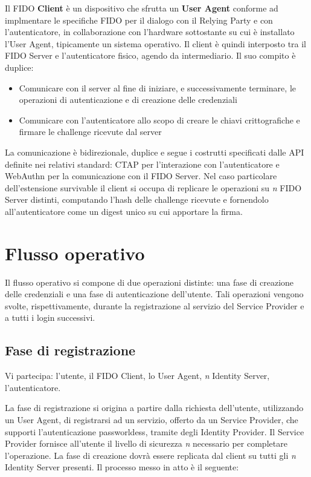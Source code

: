 Il FIDO \textbf{Client} è un dispositivo che sfrutta un \textbf{User Agent} conforme ad implmentare le specifiche FIDO per il dialogo con il Relying Party e con l'autenticatore, in collaborazione con l'hardware sottostante su cui è installato l'User Agent, tipicamente un sistema operativo. Il client è quindi interposto tra il FIDO Server e l'autenticatore fisico, agendo da intermediario. Il suo compito è duplice:
\begin{itemize}
	\item Comunicare con il server al fine di iniziare, e successivamente terminare, le operazioni di autenticazione e di creazione delle credenziali 
	\item Comunicare con l'autenticatore allo scopo di creare le chiavi crittografiche e firmare le challenge ricevute dal server
\end{itemize}
La comunicazione è bidirezionale, duplice e segue i costrutti specificati dalle API definite nei relativi standard: CTAP per l'interazione con l'autenticatore e WebAuthn per la comunicazione con il FIDO Server. 
Nel caso particolare dell'estensione survivable il client si occupa di replicare le operazioni su \emph{n} FIDO Server distinti, computando l'hash delle challenge ricevute e fornendolo all'autenticatore come un digest unico su cui apportare la firma. 


\section{Flusso operativo}
\label{flusso_operativo}

Il flusso operativo si compone di due operazioni distinte: una fase di creazione delle credenziali e una fase di autenticazione dell'utente. Tali operazioni vengono svolte, rispettivamente, durante la registrazione al servizio del Service Provider e a tutti i login successivi.

\subsection{Fase di registrazione}
\label{registrazione}

Vi partecipa: l'utente, il FIDO Client, lo User Agent, \emph{n} Identity Server, l'autenticatore.

La fase di registrazione si origina a partire dalla richiesta dell'utente, utilizzando un User Agent, di registrarsi ad un servizio, offerto da un Service Provider, che supporti l'autenticazione passworldess, tramite degli Identity Provider. Il Service Provider fornisce all'utente il livello di sicurezza \emph{n} necessario per completare l'operazione. La fase di creazione dovrà essere replicata dal client su tutti gli \emph{n} Identity Server presenti.  Il processo messo in atto è il seguente:

